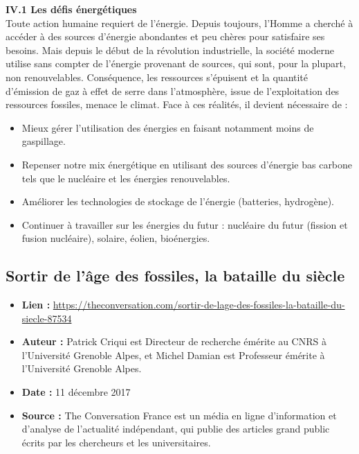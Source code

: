\documentclass[8pt]{article}
\begin{document}
\textbf{IV.1 Les défis énergétiques}\\

Toute action humaine requiert de l’énergie. Depuis toujours, l’Homme a cherché à accéder à des sources d’énergie abondantes et peu chères pour satisfaire ses besoins. Mais depuis le début de la révolution industrielle, la société moderne utilise sans compter de l’énergie provenant de sources, qui sont, pour la plupart, non renouvelables. Conséquence, les ressources s’épuisent et la quantité d’émission de gaz à effet de serre dans l’atmosphère, issue de l’exploitation des ressources fossiles, menace le climat. Face à ces réalités, il devient nécessaire de :

\begin{itemize}
	\setlength\itemsep{-0.2em}
	\item Mieux gérer l’utilisation des énergies en faisant notamment moins de gaspillage.
	\item Repenser notre mix énergétique en utilisant des sources d’énergie bas carbone tels que le nucléaire et les énergies renouvelables.
	\item Améliorer les technologies de stockage de l’énergie (batteries, hydrogène).
	\item Continuer à travailler sur les énergies du futur : nucléaire du futur (fission et fusion nucléaire), solaire, éolien, bioénergies.
\end{itemize}

\newpage

\subsection{Sortir de l’âge des fossiles, la bataille du siècle}
\begin{itemize}
	\item \textbf{Lien : }  \url{https://theconversation.com/sortir-de-lage-des-fossiles-la-bataille-du-siecle-87534} 
	\item \textbf{Auteur : } Patrick Criqui est Directeur de recherche émérite au CNRS à l'Université Grenoble Alpes, et Michel Damian est Professeur émérite à l'Université Grenoble Alpes.
	\item \textbf{Date : } 11 décembre 2017
	\item \textbf{Source : } The Conversation France est un média en ligne d'information et d'analyse de l'actualité indépendant, qui publie des articles grand public écrits par les chercheurs et les universitaires. 
\end{itemize}
\end{document}
